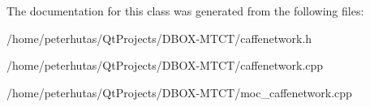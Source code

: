 The documentation for this class was generated from the following files\+:\begin{DoxyCompactItemize}
\item 
/home/peterhutas/\+Qt\+Projects/\+D\+B\+O\+X-\/\+M\+T\+C\+T/caffenetwork.\+h\item 
/home/peterhutas/\+Qt\+Projects/\+D\+B\+O\+X-\/\+M\+T\+C\+T/caffenetwork.\+cpp\item 
/home/peterhutas/\+Qt\+Projects/\+D\+B\+O\+X-\/\+M\+T\+C\+T/moc\+\_\+caffenetwork.\+cpp\end{DoxyCompactItemize}
